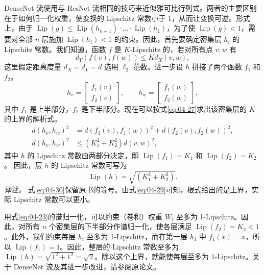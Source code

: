 DenseNet 流使用与 ResNet 流相同的技巧来近似雅可比行列式。两者的主要区别在于如何归一化权重，使变换的 Lipschitz 常数小于 1，从而让变换可逆。形式上，由于 $\operatorname{Lip}(g)\le\operatorname{Lip}(h_{n+1})\cdot\ldots\cdot\operatorname{Lip}(h_1)$，为了使 $\operatorname{Lip}(g)<1$，需要对全部 $n$ 层施加 $\operatorname{Lip}(h_i)<1$ 的约束。因此，首先要确定密集层 $h_i$ 的 Lipschitz 常数。我们知道，函数 $f$ 是 $K$-Lipschitz 的，若对所有点 $v,w$ 有
\begin{equation}
d_Y(f(v),f(w))\le Kd_X(v,w),
\tag{4.27}\label{eq:04-27}
\end{equation}
这里假定距离度量 $d_X=d_Y=d$ 选用 $\ell_2$ 范数。进一步设 $h$ 拼接了两个函数 $f_1$ 和 $f_2$。
\begin{equation}
h_v=\begin{bmatrix}f_1(v)\\f_2(v)\end{bmatrix},
\qquad
h_w=\begin{bmatrix}f_1(w)\\f_2(w)\end{bmatrix},
\tag{4.28}\label{eq:04-28}
\end{equation}
其中 $f_1$ 是上半部分，$f_2$ 是下半部分。现在可以按式\eqref{eq:04-27}求出该密集层的 $K$ 的上界的解析式。
\begin{equation}
\begin{aligned}
d(h_v,h_w)^2 &= d(f_1(v),f_1(w))^2+d(f_2(v),f_2(w))^2,\\
d(h_v,h_w)^2 &\le (K_1^2+K_2^2)d(v,w)^2,
\end{aligned}
\tag{4.29}\label{eq:04-29}
\end{equation}
其中 $h$ 的 Lipschitz 常数由两部分决定，即 $\operatorname{Lip}(f_1)=K_1$ 和 $\operatorname{Lip}(f_2)=K_2$。
因此，层 $h$ 的 Lipschitz 常数可写为
\begin{equation}
\operatorname{Lip}(h)=\sqrt{(K_1^2+K_2^2)}.
\tag{4.30}\label{eq:04-30}
\end{equation}
\emph{译注。} 式\eqref{eq:04-30}保留原书的等号。由式\eqref{eq:04-29}可知，根式给出的是上界，实际 Lipschitz 常数可以更小。

用式\eqref{eq:04-23}的谱归一化，可以约束（卷积）权重 $W_i$ 至多为 1-Lipschitz。因此，对所有 $n$ 个密集层的下半部分作谱归一化，使各层满足 $\operatorname{Lip}(f_2)=K_2<1$。此外，我们约束每层 $h_i$ 至多为 1-Lipschitz，而在第一层 $h_1$ 中 $f_1(x)=x$，所以 $\operatorname{Lip}(f_1)=1$。因此，整层的 Lipschitz 常数至多为 $\operatorname{Lip}(h)=\sqrt{1^2+1^2}=\sqrt{2}$。除以这个上界，就能使每层至多为 1-Lipschitz。关于 DenseNet 流及其进一步改进，请参阅原论文。

